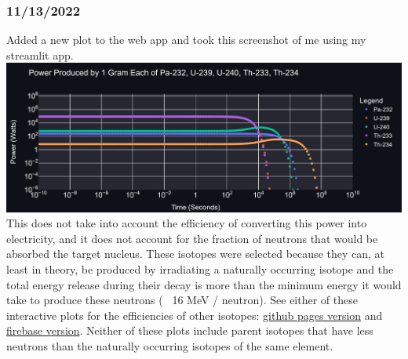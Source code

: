 \documentclass[12pt]{article}
\begin{document}
\subsubsection{11/13/2022}
Added a new plot to the web app and took this screenshot of me using my streamlit app. \\
\includegraphics[scale=.6]{Images/newplot(4).png}\\
This does not take into account the efficiency of converting this power into electricity, and it does not account for the fraction of neutrons that would be absorbed the target nucleus. These isotopes were selected because they can, at least in theory, be produced by irradiating a naturally occurring isotope and the total energy release during their decay is more than the minimum energy it would take to produce these neutrons (~ 16 MeV / neutron). See either of these interactive plots for the efficiencies of other isotopes: \href{https://marcosp7635.github.io/plots/keV_per_neutron.html}{github pages version} and \href{https://mp7635plots.web.app/keV_per_neutron.html}{firebase version}. Neither of these plots include parent isotopes that have less neutrons than the naturally occurring isotopes of the same element. 
\end{document}
